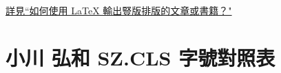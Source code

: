 \par\href{https://www.zhihu.com/question/20544732/answer/15437234}%
{詳見``如何使用 LaTeX 輸出豎版排版的文章或書籍？"}


\section{小川 弘和 SZ.CLS 字號對照表}


\begin{figure}[H]
\begin{center}
\end{center}
\end{figure}




